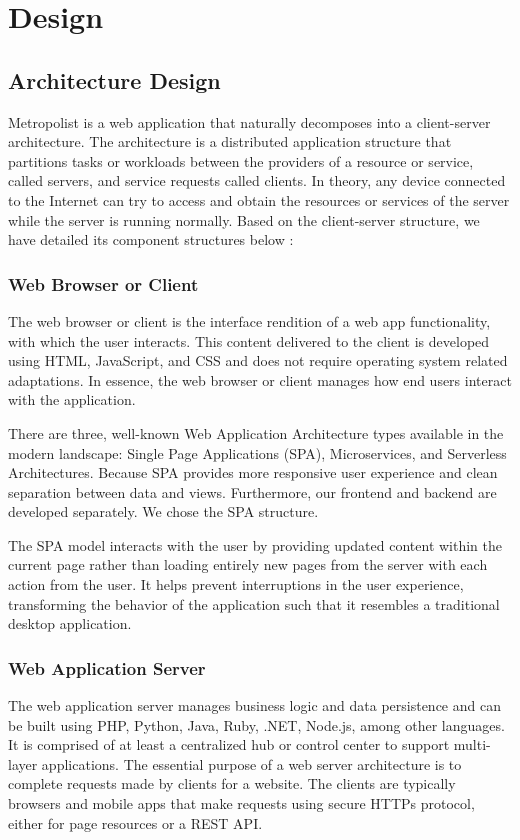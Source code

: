 \section{Design}
\label{sec:Design}

\subsection{Architecture Design}
\label{sec:Design>Architecture Design}
Metropolist is a web application that naturally decomposes into a client-server architecture. The architecture is a distributed application structure that partitions tasks or workloads between the providers of a resource or service, called servers, and service requests called clients. In theory, any device connected to the Internet can try to access and obtain the resources or services of the server while the server is running normally. Based on the client-server structure, we have detailed its component structures below \cite{web:Architecture-design}:

\subsubsection{Web Browser or Client}
\label{sec:Design>Architecture Design>Web Browser or Client}
The web browser or client is the interface rendition of a web app functionality, with which the user interacts. This content delivered to the client is developed using HTML, JavaScript, and CSS and does not require operating system related adaptations. In essence, the web browser or client manages how end users interact with the application.

There are three, well-known Web Application Architecture types available in the modern landscape: Single Page Applications (SPA), Microservices, and Serverless Architectures. Because SPA provides more responsive user experience and clean separation between data and views. Furthermore, our frontend and backend are developed separately. We chose the SPA structure.

The SPA model interacts with the user by providing updated content within the current page rather than loading entirely new pages from the server with each action from the user. It helps prevent interruptions in the user experience, transforming the behavior of the application such that it resembles a traditional desktop application.

\subsubsection{Web Application Server}
\label{sec:Design>Architecture Design>Web Application Server}
The web application server manages business logic and data persistence and can be built using PHP, Python, Java, Ruby, .NET, Node.js, among other languages. It is comprised of at least a centralized hub or control center to support multi-layer applications. The essential purpose of a web server architecture is to complete requests made by clients for a website. The clients are typically browsers and mobile apps that make requests using secure HTTPs protocol, either for page resources or a REST API.


